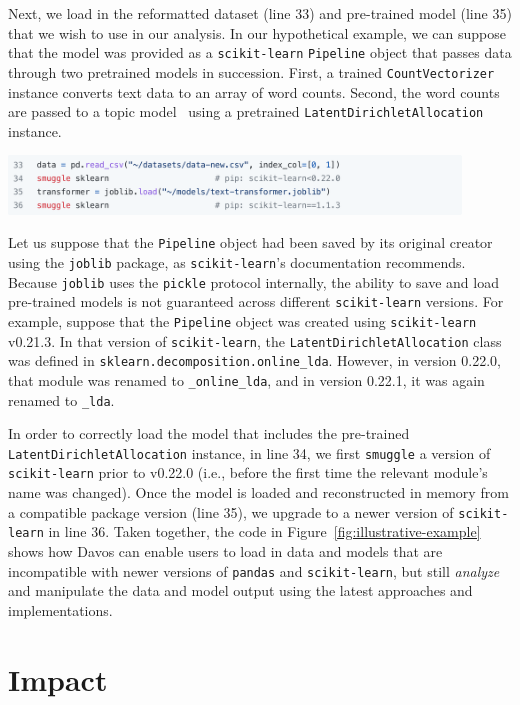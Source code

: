 \documentclass[preprint,12pt,a4paper]{elsarticle}
\begin{document}
Next, we load in the reformatted dataset (line 33) and pre-trained
model (line 35) that we wish to use in our analysis.  In our
hypothetical example, we can suppose that the model was provided as a
\texttt{scikit-learn} \texttt{Pipeline} object that passes data
through two pretrained models in succession.  First, a trained \texttt{CountVectorizer}
instance converts text data to an array of word counts.  Second, the
word counts are passed to a topic model~\cite{BleiEtal03} using a
pretrained \texttt{LatentDirichletAllocation} instance.
\begin{center}
\includegraphics[width=0.9\textwidth]{figs/example7}
\end{center}
Let us suppose that the \texttt{Pipeline} object had been saved by its
original creator using the \texttt{joblib} package, as
\texttt{scikit-learn}'s documentation recommends.  Because
\texttt{joblib} uses the \texttt{pickle} protocol internally, the
ability to save and load pre-trained models is not guaranteed across
different \texttt{scikit-learn} versions.  For example, suppose that
the \texttt{Pipeline} object was created using \texttt{scikit-learn}
v0.21.3.  In that version of \texttt{scikit-learn}, the
\texttt{LatentDirichletAllocation} class was defined in
\texttt{sklearn.decomposition.online\_lda}.  However, in version
0.22.0, that module was renamed to \texttt{\_online\_lda}, and in
version 0.22.1, it was again renamed to \texttt{\_lda}.

In order to correctly load the model that includes the pre-trained
\texttt{LatentDirichlet\-Allocation} instance, in line 34, we first
\texttt{smuggle} a version of \texttt{scikit-learn} prior to v0.22.0 (i.e.,
before the first time the relevant module's name was changed).  Once
the model is loaded and reconstructed in memory from a compatible
package version (line 35), we upgrade to a newer version of
\texttt{scikit-learn} in line 36.  Taken together, the code in
Figure~\ref{fig:illustrative-example} shows how Davos can
enable users to load in data and models that are incompatible with
newer versions of \texttt{pandas} and \texttt{scikit-learn}, but still
\textit{analyze} and manipulate the data and model output using the
latest approaches and implementations.


\section{Impact}
\end{document}
